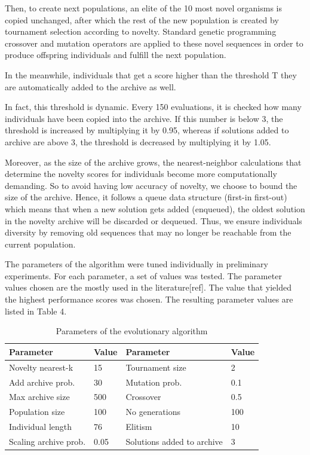 Then, to create next populations, an elite of the 10 most novel organisms is copied unchanged, after which the rest of the new population is created by tournament selection according to novelty. Standard genetic programming crossover and mutation operators are applied to these novel sequences in order to produce offspring individuals and fulfill the next population.

In the meanwhile, individuals that get a score higher than the threshold T they are automatically added to the archive as well. 

In fact, this threshold is dynamic. Every 150 evaluations, it is checked how many individuals have been copied into the archive. If this number is below 3, the threshold is increased by multiplying it by 0.95, whereas if solutions added to archive are above 3, the threshold is decreased by multiplying it by 1.05. 

Moreover, as the size of the archive grows, the nearest-neighbor calculations that determine the novelty scores for individuals become more computationally demanding. So to avoid having low accuracy of novelty, we choose to bound the size of the archive. Hence, it follows a queue data structure (first-in first-out) which means that when a new solution gets added (enqueued), the oldest solution in the novelty archive will be discarded or dequeued. Thus, we ensure individuals diversity by removing old sequences that may no longer be reachable from the current population.

The parameters of the algorithm were tuned individually in preliminary experiments. For each parameter, a set of values was tested. The parameter values chosen are the mostly used in the literature[ref]. The value that yielded the highest performance scores was chosen. The resulting parameter values are listed in Table 4.
\begin{table}
		\caption{Parameters of the evolutionary algorithm}
		\begin{tabular}{ l l || l l }
			Parameter & Value & Parameter & Value \\	\hline
			Novelty nearest-k  & 15 &  Tournament size & 2\\ 
			Add archive prob. & 30 &  Mutation prob. & 0.1\\  
			Max archive size & 500 &  Crossover & 0.5  \\  
			Population size & 100 &  No generations &  100 \\  
			Individual length & 76 & Elitism & 10  \\ 
			Scaling archive prob. & 0.05 & Solutions added to archive & 3  \\ 
		\end{tabular}
\end{table}

